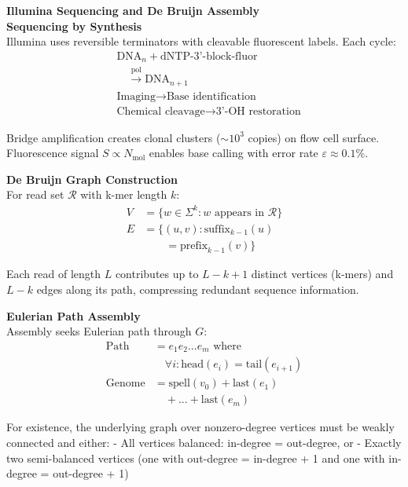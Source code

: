 \begin{technical}
{\Large\textbf{Illumina Sequencing and De Bruijn Assembly}}\\[0.3em]

\textbf{Sequencing by Synthesis}\\[0.5em]
Illumina uses reversible terminators with cleavable fluorescent labels. Each cycle:
\begin{align*}
&\text{DNA}_n + \text{dNTP-3'-block-fluor}\\
&\quad\xrightarrow{\text{pol}} \text{DNA}_{n+1}\\
&\text{Imaging} \rightarrow \text{Base identification}\\
&\text{Chemical cleavage} \rightarrow \text{3'-OH restoration}
\end{align*}

Bridge amplification creates clonal clusters ($\sim10^3$ copies) on flow cell surface. Fluorescence signal $S \propto N_{\text{mol}}$ enables base calling with error rate $\varepsilon \approx 0.1\%$.

\textbf{De Bruijn Graph Construction}\\[0.5em]
For read set $\mathcal{R}$ with k-mer length $k$:
\begin{align*}
V &= \{w \in \Sigma^k : w \text{ appears in } \mathcal{R}\}\\
E &= \{(u,v) : \text{suffix}_{k-1}(u)\\
&\quad\quad = \text{prefix}_{k-1}(v)\}
\end{align*}

Each read of length $L$ contributes up to $L-k+1$ distinct vertices (k-mers) and $L-k$ edges along its path, compressing redundant sequence information.

\textbf{Eulerian Path Assembly}\\[0.5em]
Assembly seeks Eulerian path through $G$:
\begin{align*}
\text{Path} &= e_1e_2...e_m \text{ where}\\
&\quad \forall i: \text{head}(e_i) = \text{tail}(e_{i+1})\\
\text{Genome} &= \text{spell}(v_0) + \text{last}(e_1)\\
&\quad + ... + \text{last}(e_m)
\end{align*}

For existence, the underlying graph over nonzero-degree vertices must be weakly connected and either:
- All vertices balanced: in-degree = out-degree, or
- Exactly two semi-balanced vertices (one with out-degree = in-degree + 1 and one with in-degree = out-degree + 1)


\end{technical}
